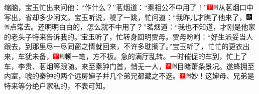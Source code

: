缩脑，宝玉忙出来问他：``作什么？''茗烟道：``秦相公不中用了！''{\includegraphics[width=3mm]{../Images/00002}\includegraphics[width=3mm]{../Images/00011}\footnotesize \kaishu 从茗烟口中写出，省却多少闲文。}宝玉听说，唬了一跳，忙问道：``我昨儿才瞧了他来了，{\includegraphics[width=3mm]{../Images/00004}\includegraphics[width=3mm]{../Images/00011}\footnotesize \kaishu 点常去。}还明明白白的，怎么就不中用了？''茗烟道：``我也不知道，才刚是他家的老头子特来告诉我的。''宝玉听了，忙转身回明贾母。贾母吩咐：``好生派妥当人跟去，到那里尽一尽同窗之情就回来，不许多耽搁了。''宝玉听了，忙忙的更衣出来，车犹未备，{\includegraphics[width=3mm]{../Images/00002}\includegraphics[width=3mm]{../Images/00011}\footnotesize \kaishu 顿一笔，方不板。}急的满厅乱转。一时催促的车到，忙上了车，李贵、茗烟等跟随。来至秦钟门首，悄无一人，{\includegraphics[width=3mm]{../Images/00002}\includegraphics[width=3mm]{../Images/00011}\footnotesize \kaishu 目睹萧条景况。}遂蜂拥至内室，唬的秦钟的两个远房婶子并几个弟兄都藏之不迭。{\includegraphics[width=3mm]{../Images/00002}\includegraphics[width=3mm]{../Images/00011}\footnotesize \kaishu 妙！这婶母、兄弟是特来等分绝户家私的，不表可知。}

